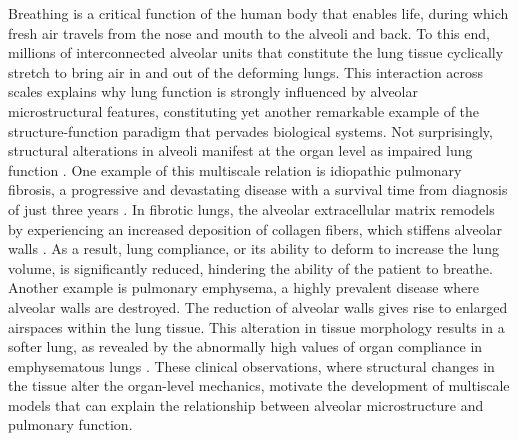 \documentclass[preprint,3p,12pt,number,sort&compress]{elsarticle}
\begin{document}

Breathing is a critical function of the human body that enables life, during which fresh air travels from the nose and mouth to the alveoli and back. To this end, millions of interconnected alveolar units that constitute the lung tissue cyclically stretch to bring air in and out of the deforming lungs. This interaction across scales explains why lung function is strongly influenced by alveolar microstructural features, constituting yet another remarkable example of the structure-function paradigm that pervades biological systems. Not surprisingly, structural alterations in alveoli manifest at the organ level as impaired lung function \cite{dimbath2021implications}. One example of this multiscale relation is idiopathic pulmonary fibrosis, a progressive and devastating disease with a survival time from diagnosis of just three years \cite{RaghuEtal2011}. In fibrotic lungs, the alveolar extracellular matrix remodels by experiencing an increased deposition of collagen fibers, which stiffens alveolar walls \cite{upagupta2018matrix}. As a result, lung compliance, or its ability to deform to increase the lung volume, is significantly reduced, hindering the ability of the patient to breathe. Another example is pulmonary emphysema, a highly prevalent disease where alveolar walls are destroyed. The reduction of alveolar walls gives rise to enlarged airspaces within the lung tissue. This alteration in tissue morphology results in a softer lung, as revealed by the abnormally high values of organ compliance in emphysematous lungs \cite{SukiEtal2013,papandrinopoulou2012lung}. These clinical observations, where structural changes in the tissue alter the organ-level mechanics, motivate the development of multiscale models that can explain the relationship between alveolar microstructure and pulmonary function.\\
\end{document}

